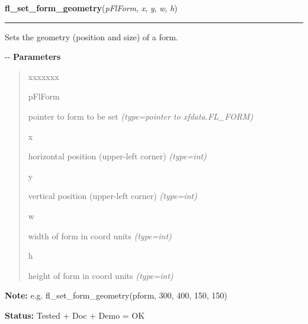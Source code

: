 \hspace{.8\funcindent}\begin{boxedminipage}{\funcwidth}

    \raggedright \textbf{fl\_set\_form\_geometry}(\textit{pFlForm}, \textit{x}, \textit{y}, \textit{w}, \textit{h})

    \vspace{-1.5ex}

    \rule{\textwidth}{0.5\fboxrule}
\setlength{\parskip}{2ex}

Sets the geometry (position and size) of a form.

-{}-
\setlength{\parskip}{1ex}
      \textbf{Parameters}
      \vspace{-1ex}

      \begin{quote}
        \begin{Ventry}{xxxxxxx}

          \item[pFlForm]


pointer to form to be set
            {\it (type=pointer to xfdata.FL\_FORM)}

          \item[x]


horizontal position (upper-left corner)
            {\it (type=int)}

          \item[y]


vertical position (upper-left corner)
            {\it (type=int)}

          \item[w]


width of form in coord units
            {\it (type=int)}

          \item[h]


height of form in coord units
            {\it (type=int)}

        \end{Ventry}

      \end{quote}

\textbf{Note:} 
e.g. fl\_set\_form\_geometry(pform, 300, 400, 150, 150)


\textbf{Status:} 
Tested + Doc + Demo = OK


    \end{boxedminipage}

    \label{xformslib:flbasic:fl_set_form_geometry}

